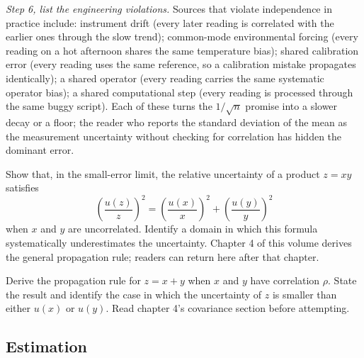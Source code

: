 \begin{exercise}
\textit{Step 6, list the engineering violations.} Sources that
violate independence in practice include: instrument drift (every
later reading is correlated with the earlier ones through the slow
trend); common-mode environmental forcing (every reading on a hot
afternoon shares the same temperature bias); shared calibration error
(every reading uses the same reference, so a calibration mistake
propagates identically); a shared operator (every reading carries the
same systematic operator bias); a shared computational step (every
reading is processed through the same buggy script). Each of these
turns the $1/\sqrt{n}$ promise into a slower decay or a floor; the
reader who reports the standard deviation of the mean as the
measurement uncertainty without checking for correlation has hidden
the dominant error.
\end{exercise}

\begin{exercise}
Show that, in the small-error limit, the relative uncertainty of a
product $z = xy$ satisfies
\[
\left(\frac{u(z)}{z}\right)^{2}
= \left(\frac{u(x)}{x}\right)^{2}
+ \left(\frac{u(y)}{y}\right)^{2}
\]
when $x$ and $y$ are uncorrelated. Identify a domain in which this
formula systematically underestimates the uncertainty. Chapter 4 of
this volume derives the general propagation rule; readers can return
here after that chapter.
\end{exercise}

\begin{exercise}
Derive the propagation rule for $z = x + y$ when $x$ and $y$ have
correlation $\rho$. State the result and identify the case in which
the uncertainty of $z$ is smaller than either $u(x)$ or $u(y)$. Read
chapter 4's covariance section before attempting.
\end{exercise}

\subsection*{Estimation}

